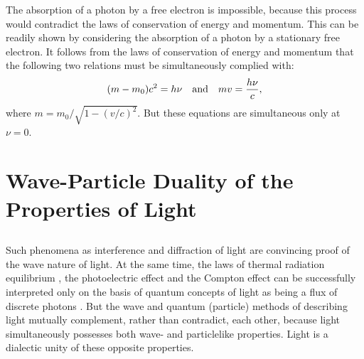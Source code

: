 The absorption of a photon by a free electron is impossible,
because this process would contradict the laws of conservation
of energy and momentum. This can be readily shown by considering the absorption of a photon by a stationary free electron. It follows from the laws of conservation of energy and momentum that the following two relations must be simultaneously complied with:
\begin{equation*}%
(m - m_{0})c^{2} = h\nu \qand mv = \frac{h \nu}{c},
\end{equation*}
where $m = m_{0}/\sqrt{1 - (v/c)^{2}}$. But these equations are simultaneous only at $\nu = 0$.

\section{Wave-Particle Duality of the Properties of Light}
\label{sec-37.4}

\subsection{}\label{37.4.1} Such phenomena as interference  and diffraction of light  are convincing proof of the wave nature of light. At the same time, the laws of thermal radiation equilibrium , the photoelectric effect  and the Compton effect  can be successfully interpreted only on the basis of quantum concepts of light as being a flux of discrete photons . But the wave and quantum (particle) methods of describing light mutually complement, rather than contradict, each other, because light simultaneously possesses both wave- and particlelike properties. Light is a dialectic unity of these opposite properties.

